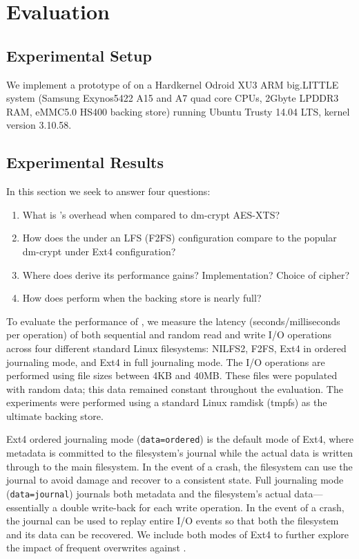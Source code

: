 \chapter{Evaluation} \label{sec:evaluation}

\section{Experimental Setup}

We implement a prototype of \SYSTEM{} on a Hardkernel Odroid XU3 ARM big.LITTLE
system (Samsung Exynos5422 A15 and A7 quad core CPUs, 2Gbyte LPDDR3 RAM, eMMC5.0
HS400 backing store) running Ubuntu Trusty 14.04 LTS, kernel version 3.10.58. 

\section{Experimental Results}

In this section we seek to answer four questions:
\begin{enumerate}
\item What is \SYSTEM{}'s overhead when compared to dm-crypt AES-XTS?
\item How does the \SYSTEM{} under an LFS (\ie F2FS) configuration compare to
the popular dm-crypt under Ext4 configuration?
\item Where does \SYSTEM{} derive its performance gains? Implementation? Choice
of cipher?
\item How does \SYSTEM{} perform when the backing store is nearly full?
\end{enumerate}

To evaluate the performance of \SYSTEM{}, we measure the latency
(seconds/milliseconds per operation) of both sequential and random read and
write I/O operations across four different standard Linux filesystems: NILFS2,
F2FS, Ext4 in ordered journaling mode, and Ext4 in full journaling mode. The I/O
operations are performed using file sizes between 4KB and 40MB. These files
were populated with random data; this data remained constant throughout the
evaluation. The experiments were performed using a standard Linux ramdisk
(tmpfs) as the ultimate backing store.

Ext4 ordered journaling mode (\texttt{data=ordered}) is the default mode of
Ext4, where metadata is committed to the filesystem's journal while
the actual data is written through to the main filesystem. In the event of a
crash, the filesystem can use the journal to avoid damage and recover to a
consistent state. Full journaling mode (\texttt{data=journal}) journals both
metadata and the filesystem's actual data---essentially a double write-back for
each write operation. In the event of a crash, the journal can be used to replay
entire I/O events so that both the filesystem and its data can be recovered. We
include both modes of Ext4 to further explore the impact of frequent overwrites
against \SYSTEM{}.

